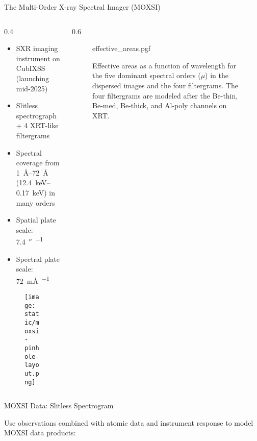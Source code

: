 \documentclass[final]{beamer}
\newlength{\colwidth}
\begin{document}
\begin{frame}[t]
\begin{columns}[t]
\begin{column}{\colwidth}
\begin{block}{The Multi-Order X-ray Spectral Imager (MOXSI)}
    \begin{columns}[t]
      \begin{column}{0.4\colwidth}
        \begin{itemize}
          \item SXR imaging instrument on \alert{CubIXSS (launching mid-2025)}
          \item \alert{Slitless spectrograph} + 4 XRT-like filtergrams
          \item Spectral coverage from \alert{\SIrange{1}{72}{\angstrom}} (\SIrange{12.4}{0.17}{\kilo\eV}) in many orders
          \item Spatial plate scale: \SI{7.4}{\arcsecond\per\pixel}
          \item Spectral plate scale: \SI{72}{\milli\angstrom\per\pixel}
        \end{itemize}
        \begin{figure}
          \centering
          \texttt{[image: static/moxsi-pinhole-layout.png]}
        \end{figure}
      \end{column}
      \begin{column}{0.6\colwidth}
        \begin{figure}
          \centering
          {effective_areas.pgf}
          \caption{Effective areas as a function of wavelength for the five dominant spectral orders ($\mu$) in the dispersed images and the four filtergrams. The four filtergrams are modeled after the Be-thin, Be-med, Be-thick, and Al-poly channels on XRT.}
          \label{fig:effective_areas}
        \end{figure}
      \end{column}
    \end{columns}

  \end{block}

  \begin{block}{MOXSI Data: Slitless Spectrogram}
    
    Use \alert{observations} combined with \alert{atomic data} and \alert{instrument response} to model MOXSI data products: 


\end{block}
\end{column}
\end{columns}
\end{frame}
\end{document}
